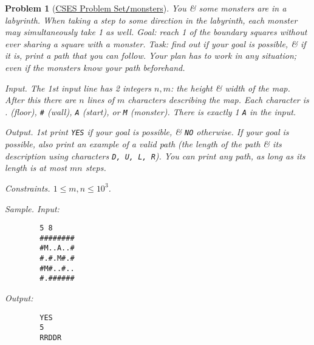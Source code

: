 \documentclass{article}
\newtheorem{problem}{Problem}
\begin{document}
\begin{problem}[\href{{https://cses.fi/problemset/task/1194}}{CSES Problem Set{\tt/}monsters}]
	You \& some monsters are in a labyrinth. When taking a step to some direction in the labyrinth, each monster may simultaneously take 1 as well. Goal: reach 1 of the boundary squares without ever sharing a square with a monster. Task: find out if your goal is possible, \& if it is, print a path that you can follow. Your plan has to work in any situation; even if the monsters know your path beforehand.
	\item {\sf Input.} The 1st input line has 2 integers $n,m$: the height \& width of the map. After this there are $n$ lines of $m$ characters describing the map. Each character is . (floor), {\tt\#} (wall), {\tt A} (start), or {\tt M} (monster). There is exactly 1 {\tt A} in the input.
	\item {\sf Output.} 1st print {\tt YES} if your goal is possible, \& {\tt NO} otherwise. If your goal is possible, also print an example of a valid path (the length of the path \& its description using characters {\tt D, U, L, R}). You can print any path, as long as its length is at most $mn$ steps.
	\item {\sf Constraints.} $1\le m,n\le10^3$.
	\item {\sf Sample.} Input:
	\begin{verbatim}
		5 8
		########
		#M..A..#
		#.#.M#.#
		#M#..#..
		#.######
	\end{verbatim}
	Output:
	\begin{verbatim}
		YES
		5
		RRDDR
	\end{verbatim}
\end{problem}
\end{document}
